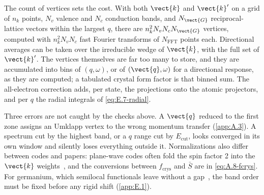 The count of vertices sets the cost. With both $\vect{k}$ and $\vect{k}'$ on a grid of $n_k$ points, $N_v$ valence and $N_c$ conduction bands, and $N_{\vect{G}}$ reciprocal-lattice vectors within the largest $q$, there are $n_k^2N_vN_cN_{\vect{G}}$ vertices, computed with $n_k^2N_vN_c$ fast Fourier transforms of $N_{\mathrm{FFT}}$ points each. Directional averages can be taken over the irreducible wedge of $\vect{k}$, with the full set of $\vect{k}'$. The vertices themselves are far too many to store, and they are accumulated into bins of $(q,\omega)$, or of $(\vect{q},\omega)$ for a directional response, as they are computed; a tabulated crystal form factor is that binned sum. The all-electron correction adds, per state, the projections onto the atomic projectors, and per $q$ the radial integrals of \cref{eq:E.7-radial}.

Three errors are not caught by the checks above. A $\vect{q}$ reduced to the first zone assigns an Umklapp vertex to the wrong momentum transfer (\cref{app:A.3}). A spectrum cut by the highest band, or a $q$ range cut by $E_{\mathrm{cut}}$, looks converged in its own window and silently loses everything outside it. Normalizations also differ between codes and papers: plane-wave codes often fold the spin factor 2 into the $\vect{k}$ weights~\cite[Eq.~(4.2)]{essig2016direct}, and the conversions between $f_{\mathrm{crys}}$ and $\bar S$ are in \cref{eq:A.8-fcrys}. For germanium, which semilocal functionals leave without a gap~\cite[Sect.~2.1]{griffin2021extended}, the band order must be fixed before any rigid shift (\cref{app:E.1}).

